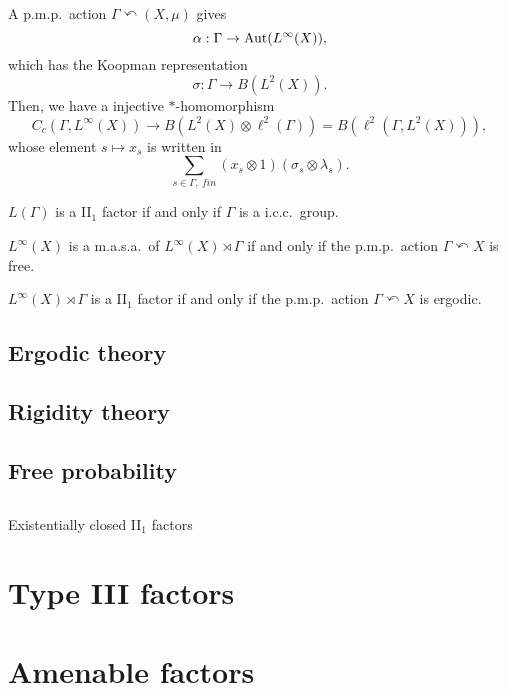 \documentclass{../../large}
\begin{document}
\section{}
\begin{prb}
A p.m.p.~action $\Gamma\curvearrowleft(X,\mu)$ gives
\[\alpha:\Gamma\to\operatorname{Aut}(L^\infty(X)),\]
which has the Koopman representation
\[\sigma:\Gamma\to B(L^2(X)).\]
Then, we have a injective $*$-homomorphism
\[C_c(\Gamma,L^\infty(X))\to B(L^2(X)\otimes\ell^2(\Gamma))=B(\ell^2(\Gamma,L^2(X))),\]
whose element $s\mapsto x_s$ is written in
\[\sum_{s\in\Gamma,\ fin}(x_s\otimes1)(\sigma_s\otimes\lambda_s).\]

\begin{parts}
\item $L(\Gamma)$ is a II$_1$ factor if and only if $\Gamma$ is a i.c.c.~group.
\item $L^\infty(X)$ is a m.a.s.a.~of $L^\infty(X)\rtimes\Gamma$ if and only if the p.m.p.~action $\Gamma\curvearrowleft X$ is free.
\item $L^\infty(X)\rtimes\Gamma$ is a II$_1$ factor if and only if the p.m.p.~action $\Gamma\curvearrowleft X$ is ergodic.
\end{parts}
\end{prb}


\section{Ergodic theory}
\section{Rigidity theory}
\section{Free probability}
\section{}
Existentially closed II$_1$ factors





\chapter{Type III factors}


\chapter{Amenable factors}
\end{document}
